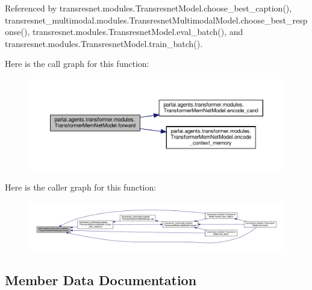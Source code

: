 Referenced by transresnet.\+modules.\+Transresnet\+Model.\+choose\+\_\+best\+\_\+caption(), transresnet\+\_\+multimodal.\+modules.\+Transresnet\+Multimodal\+Model.\+choose\+\_\+best\+\_\+response(), transresnet.\+modules.\+Transresnet\+Model.\+eval\+\_\+batch(), and transresnet.\+modules.\+Transresnet\+Model.\+train\+\_\+batch().

Here is the call graph for this function\+:
\nopagebreak
\begin{figure}[H]
\begin{center}
\leavevmode
\includegraphics[width=350pt]{classparlai_1_1agents_1_1transformer_1_1modules_1_1TransformerMemNetModel_a8c27f924c01b5017c7968b9d98969496_cgraph}
\end{center}
\end{figure}
Here is the caller graph for this function\+:
\nopagebreak
\begin{figure}[H]
\begin{center}
\leavevmode
\includegraphics[width=350pt]{classparlai_1_1agents_1_1transformer_1_1modules_1_1TransformerMemNetModel_a8c27f924c01b5017c7968b9d98969496_icgraph}
\end{center}
\end{figure}


\subsection{Member Data Documentation}
\mbox{\label{classparlai_1_1agents_1_1transformer_1_1modules_1_1TransformerMemNetModel_a95c72e762694a7017243bfcf0b37a1e7}} 
